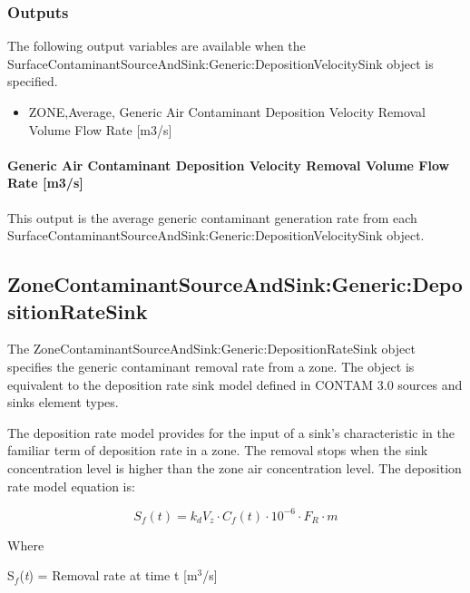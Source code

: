 \subsubsection{Outputs}\label{outputs-12-003}

The following output variables are available when the Surface\-Contaminant\-Source\-And\-Sink:\-Generic:\-Deposition\-Velocity\-Sink object is specified.

\begin{itemize}
    \tightlist
  \item
    ZONE,Average, Generic Air Contaminant Deposition Velocity Removal Volume Flow Rate {[}m3/s{]}
\end{itemize}

\paragraph{Generic Air Contaminant Deposition Velocity Removal Volume Flow Rate {[}m3/s{]}}\label{generic-air-contaminant-deposition-velocity-removal-volume-flow-rate-m3s}

This output is the average generic contaminant generation rate from each Surface\-Contaminant\-Source\-And\-Sink:\-Generic:\-Deposition\-Velocity\-Sink object.

\subsection{Zone\-Con\-taminant\-Source\-And\-Sink:\-Generic:\-Deposition\-Rate\-Sink}\label{zonecontaminantsourceandsinkgenericdepositionratesink}

The Zone\-Contaminant\-Source\-And\-Sink:\-Generic:\-Deposition\-Rate\-Sink object specifies the generic contaminant removal rate from a zone. The object is equivalent to the deposition rate sink model defined in CONTAM 3.0 sources and sinks element types.

The deposition rate model provides for the input of a sink's characteristic in the familiar term of deposition rate in a zone. The removal stops when the sink concentration level is higher than the zone air concentration level. The deposition rate model equation is:

\begin{equation}
{S_f}(t) = {k_d}{V_z} \cdot {C_f}(t) \cdot 10^{-6} \cdot {F_R} \cdot m
\end{equation}

Where

S\(_{f}\)(\emph{t}) = Removal rate at time t {[}m\(^{3}\)/s{]}

